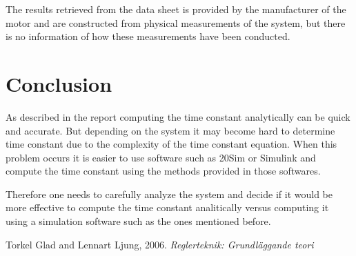 \documentclass[12pt,a4paper]{article}
\begin{document}
The results retrieved from the data sheet is provided by the manufacturer of the motor and are constructed from physical measurements of the system, but there is no information of how these measurements have been conducted.

\section{Conclusion}
As described in the report computing the time constant analytically can be quick and accurate. But depending on the system it may become hard to determine time constant due to the complexity of the time constant equation. When this problem occurs it is easier to use software such as 20Sim or Simulink and compute the time constant using the methods provided in those softwares.

Therefore one needs to carefully analyze the system and decide if it would be more effective to compute the time constant analitically versus computing it using a simulation software such as the ones mentioned before.

\begin{thebibliography}{99}
 Torkel Glad and Lennart Ljung, 2006. \emph{Reglerteknik: Grundläggande teori}
\end{thebibliography}
\end{document}
